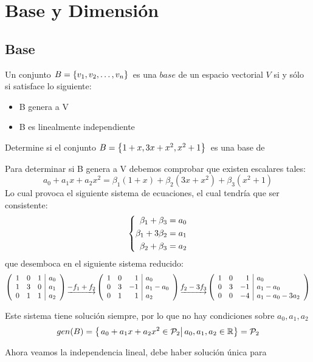 \chapter{Base y Dimensión}

\section{Base}
\begin{dfn}[Base]
Un conjunto $B= \lbrace v_1, v_2, \ldots, v_n \rbrace$\ es una $base$ de un espacio vectorial $V$ si y s\'olo si satisface lo siguiente:
\begin{itemize}
\item B genera a V
\item B es linealmente independiente
\end{itemize}

\end{dfn}

\begin{ejemplo}
Determine si el conjunto $B= \left\{
1+x, 3x+x^2, x^2+1
 \right\} $\ es una base de \pdos
\end{ejemplo}
\sol
Para determinar si B genera a V debemos comprobar que existen escalares tales:~\\

\[a_0+a_1 x+a_2 x^2=
\beta_1(1+x)+
\beta_2(3x+x^2)+
\beta_3(x^2+1)
\]
Lo cual provoca el siguiente sistema de ecuaciones, el cual tendría que ser consistente:
$$\left\lbrace \begin{aligned} \beta_1 + \beta_3 = a_0\\\beta_1 + 3\beta_2 = a_1\\\beta_2 + \beta_3 = a_2 \end{aligned}\right. $$
que desemboca en el siguiente sistema reducido:
$$\reducir{{rrr|l}}{1&0&1&a_0\\1&3&0&a_1\\0&1&1&a_2}
\underrightarrow{-f_1+f_2}
\reducir{rrr|l}{1&0&1&a_0\\0&3&-1&a_1-a_0\\0&1&1&a_2}
\underrightarrow{f_2 - 3f_3}
\reducir{rrr|l}{1&0&1&a_0\\0&3&-1&a_1-a_0\\0&0&-4&a_1-a_0-3a_2}$$

Este sistema tiene solución siempre, por lo que no hay condiciones sobre $a_0, a_1, a_2$
\[gen(B)=
\left\{ \left. a_0+a_1 x+a_2 x^2 \in \mathcal{P}_2\right| 
a_0, a_1, a_2 \in \mathbb{R}
 \right\}=\mathcal{P}_2
\]

Ahora veamos la independencia lineal, debe haber solución única para

